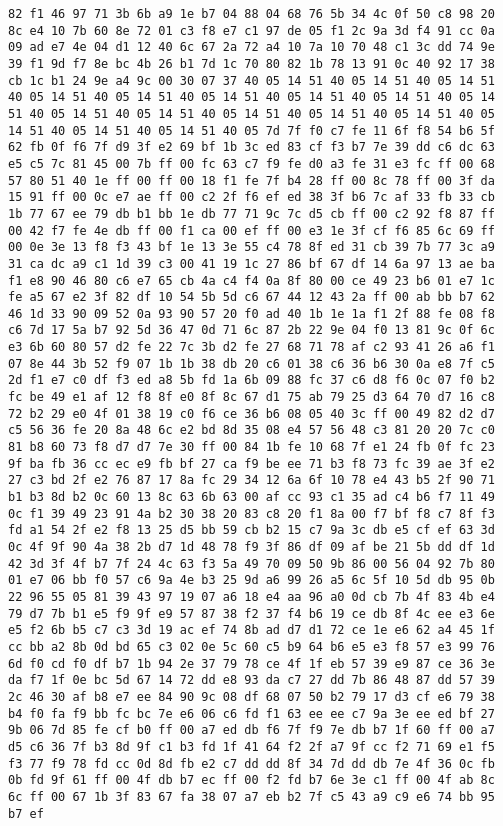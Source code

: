 \documentclass{article}
\begin{document}
\begin{verbatim}
82 f1 46 97 71 3b 6b a9 1e b7 04 88 04 68 76 5b 34 4c 0f 50 c8 98 20 8c e4 10 7b 60 8e 72 01 c3 f8 e7 c1 97 de 05 f1 2c 9a 3d f4 91 cc 0a 09 ad e7 4e 04 d1 12 40 6c 67 2a 72 a4 10 7a 10 70 48 c1 3c dd 74 9e 39 f1 9d f7 8e bc 4b 26 b1 7d 1c 70 80 82 1b 78 13 91 0c 40 92 17 38 cb 1c b1 24 9e a4 9c 00 30 07 37 40 05 14 51 40 05 14 51 40 05 14 51 40 05 14 51 40 05 14 51 40 05 14 51 40 05 14 51 40 05 14 51 40 05 14 51 40 05 14 51 40 05 14 51 40 05 14 51 40 05 14 51 40 05 14 51 40 05 14 51 40 05 14 51 40 05 14 51 40 05 7d 7f f0 c7 fe 11 6f f8 54 b6 5f 62 fb 0f f6 7f d9 3f e2 69 bf 1b 3c ed 83 cf f3 b7 7e 39 dd c6 dc 63 e5 c5 7c 81 45 00 7b ff 00 fc 63 c7 f9 fe d0 a3 fe 31 e3 fc ff 00 68 57 80 51 40 1e ff 00 ff 00 18 f1 fe 7f b4 28 ff 00 8c 78 ff 00 3f da 15 91 ff 00 0c e7 ae ff 00 c2 2f f6 ef ed 38 3f b6 7c af 33 fb 33 cb 1b 77 67 ee 79 db b1 bb 1e db 77 71 9c 7c d5 cb ff 00 c2 92 f8 87 ff 00 42 f7 fe 4e db ff 00 f1 ca 00 ef ff 00 e3 1e 3f cf f6 85 6c 69 ff 00 0e 3e 13 f8 f3 43 bf 1e 13 3e 55 c4 78 8f ed 31 cb 39 7b 77 3c a9 31 ca dc a9 c1 1d 39 c3 00 41 19 1c 27 86 bf 67 df 14 6a 97 13 ae ba f1 e8 90 46 80 c6 e7 65 cb 4a c4 f4 0a 8f 80 00 ce 49 23 b6 01 e7 1c fe a5 67 e2 3f 82 df 10 54 5b 5d c6 67 44 12 43 2a ff 00 ab bb b7 62 46 1d 33 90 09 52 0a 93 90 57 20 f0 ad 40 1b 1e 1a f1 2f 88 fe 08 f8 c6 7d 17 5a b7 92 5d 36 47 0d 71 6c 87 2b 22 9e 04 f0 13 81 9c 0f 6c e3 6b 60 80 57 d2 fe 22 7c 3b d2 fe 27 68 71 78 af c2 93 41 26 a6 f1 07 8e 44 3b 52 f9 07 1b 1b 38 db 20 c6 01 38 c6 36 b6 30 0a e8 7f c5 2d f1 e7 c0 df f3 ed a8 5b fd 1a 6b 09 88 fc 37 c6 d8 f6 0c 07 f0 b2 fc be 49 e1 af 12 f8 8f e0 8f 8c 67 d1 75 ab 79 25 d3 64 70 d7 16 c8 72 b2 29 e0 4f 01 38 19 c0 f6 ce 36 b6 08 05 40 3c ff 00 49 82 d2 d7 c5 56 36 fe 20 8a 48 6c e2 bd 8d 35 08 e4 57 56 48 c3 81 20 20 7c c0 81 b8 60 73 f8 d7 d7 7e 30 ff 00 84 1b fe 10 68 7f e1 24 fb 0f fc 23 9f ba fb 36 cc ec e9 fb bf 27 ca f9 be ee 71 b3 f8 73 fc 39 ae 3f e2 27 c3 bd 2f e2 76 87 17 8a fc 29 34 12 6a 6f 10 78 e4 43 b5 2f 90 71 b1 b3 8d b2 0c 60 13 8c 63 6b 63 00 af cc 93 c1 35 ad c4 b6 f7 11 49 0c f1 39 49 23 91 4a b2 30 38 20 83 c8 20 f1 8a 00 f7 bf f8 c7 8f f3 fd a1 54 2f e2 f8 13 25 d5 bb 59 cb b2 15 c7 9a 3c db e5 cf ef 63 3d 0c 4f 9f 90 4a 38 2b d7 1d 48 78 f9 3f 86 df 09 af be 21 5b dd df 1d 42 3d 3f 4f b7 7f 24 4c 63 f3 5a 49 70 09 50 9b 86 00 56 04 92 7b 80 01 e7 06 bb f0 57 c6 9a 4e b3 25 9d a6 99 26 a5 6c 5f 10 5d db 95 0b 22 96 55 05 81 39 43 97 19 07 a6 18 e4 aa 96 a0 0d cb 7b 4f 83 4b e4 79 d7 7b b1 e5 f9 9f e9 57 87 38 f2 37 f4 b6 19 ce db 8f 4c ee e3 6e e5 f2 6b b5 c7 c3 3d 19 ac ef 74 8b ad d7 d1 72 ce 1e e6 62 a4 45 1f cc bb a2 8b 0d bd 65 c3 02 0e 5c 60 c5 b9 64 b6 e5 e3 f8 57 e3 99 76 6d f0 cd f0 df b7 1b 94 2e 37 79 78 ce 4f 1f eb 57 39 e9 87 ce 36 3e da f7 1f 0e bc 5d 67 14 72 dd e8 93 da c7 27 dd 7b 86 48 87 dd 57 39 2c 46 30 af b8 e7 ee 84 90 9c 08 df 68 07 50 b2 79 17 d3 cf e6 79 38 b4 f0 fa f9 bb fc bc 7e e6 06 c6 fd f1 63 ee ee c7 9a 3e ee ed bf 27 9b 06 7d 85 fe cf b0 ff 00 a7 ed db f6 7f f9 7e db b7 1f 60 ff 00 a7 d5 c6 36 7f b3 8d 9f c1 b3 fd 1f 41 64 f2 2f a7 9f cc f2 71 69 e1 f5 f3 77 f9 78 fd cc 0d 8d fb e2 c7 dd dd 8f 34 7d dd db 7e 4f 36 0c fb 0b fd 9f 61 ff 00 4f db b7 ec ff 00 f2 fd b7 6e 3e c1 ff 00 4f ab 8c 6c ff 00 67 1b 3f 83 67 fa 38 07 a7 eb b2 7f c5 43 a9 c9 e6 74 bb 95 b7 ef 
\end{verbatim}
\end{document}
